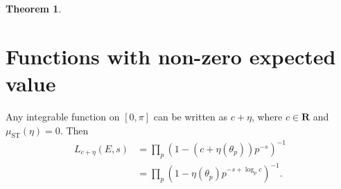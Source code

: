 \documentclass{article}
\newcommand{\bR}{\mathbf{R}}
\newcommand{\ST}{\mathrm{ST}}
\newtheorem{theorem}{Theorem}
\numberwithin{theorem}{section}
\begin{document}
\begin{theorem}

\end{theorem}





\section{Functions with non-zero expected value}

Any integrable function on $[0,\pi]$ can be written as $c+\eta$, where 
$c\in \bR$ and $\mu_\ST(\eta)=0$. Then 
\begin{align*}
	L_{c+\eta}(E,s) 
		&= \prod_p \left(1-(c+\eta(\theta_p))p^{-s}\right)^{-1} \\
		&= \prod_p \left(1-\eta(\theta_p) p^{-s + \log_p c}\right)^{-1} .
\end{align*}





\printbibliography
\end{document}
